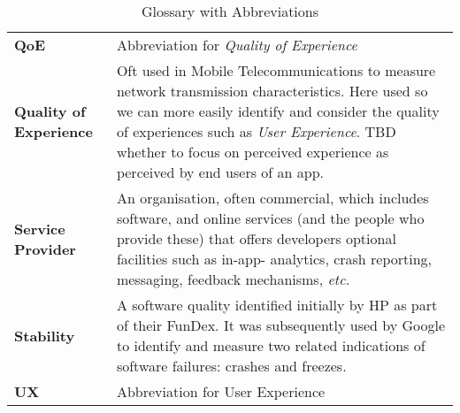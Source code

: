 \begin{table}
{\begin{tabular}{@{}>{\bfseries}p{5.3cm}p{9.2cm}@{}}
QoE & Abbreviation for \emph{Quality of Experience} \\

Quality of Experience & Oft used in Mobile Telecommunications to measure network transmission characteristics. Here used so we can more easily identify and consider the quality of experiences such as \emph{User Experience}. TBD whether to focus on perceived experience as perceived by end users of an app.\\

Service Provider &An organisation, often commercial, which includes software, and online services (and the people who provide these) that offers developers optional facilities such as in-app- analytics, crash reporting, messaging, feedback mechanisms, \emph{etc.} \\

Stability &A software quality identified initially by HP as part of their FunDex. It was subsequently used by Google to identify and measure two related indications of software failures: crashes and freezes. \\ %

UX & Abbreviation for User Experience \\
\end{tabular}}
\caption{Glossary with Abbreviations}
\end{table}


\clearpage